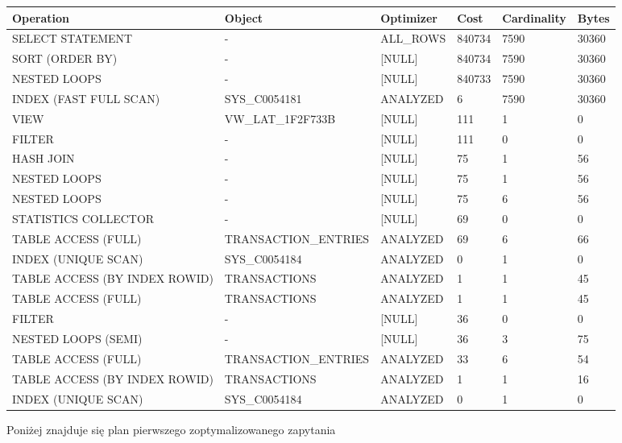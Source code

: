 \documentclass[11pt]{article}
\numberwithin{figure}{subsection}
\begin{document}
		\begin{tabularx}{\textwidth}{|X|X|X|X|X|X|}
Operation&Object&Optimizer&Cost&Cardinality&Bytes\\ \hline
SELECT STATEMENT& - &ALL\_ROWS&840734&7590&30360\\ \hline
SORT (ORDER BY)& - &[NULL]&840734&7590&30360\\ \hline
NESTED LOOPS& - &[NULL]&840733&7590&30360\\ \hline
INDEX (FAST FULL SCAN)&SYS\_C0054181&ANALYZED&6&7590&30360\\ \hline
VIEW&VW\_LAT\_1F2F733B&[NULL]&111&1&0\\ \hline
FILTER& - &[NULL]&111&0&0\\ \hline
HASH JOIN& - &[NULL]&75&1&56\\ \hline
NESTED LOOPS& - &[NULL]&75&1&56\\ \hline
NESTED LOOPS& - &[NULL]&75&6&56\\ \hline
STATISTICS COLLECTOR& - &[NULL]&69&0&0\\ \hline
TABLE ACCESS (FULL)&TRANSACTION\_ENTRIES&ANALYZED&69&6&66\\ \hline
INDEX (UNIQUE SCAN)&SYS\_C0054184&ANALYZED&0&1&0\\ \hline
TABLE ACCESS (BY INDEX ROWID)&TRANSACTIONS&ANALYZED&1&1&45\\ \hline
TABLE ACCESS (FULL)&TRANSACTIONS&ANALYZED&1&1&45\\ \hline
FILTER& - &[NULL]&36&0&0\\ \hline
NESTED LOOPS (SEMI)& - &[NULL]&36&3&75\\ \hline
TABLE ACCESS (FULL)&TRANSACTION\_ENTRIES&ANALYZED&33&6&54\\ \hline
TABLE ACCESS (BY INDEX ROWID)&TRANSACTIONS&ANALYZED&1&1&16\\ \hline
INDEX (UNIQUE SCAN)&SYS\_C0054184&ANALYZED&0&1&0\\ \hline
		\end{tabularx}
		
		Poniżej znajduje się plan pierwszego zoptymalizowanego zapytania \\
		
\end{document}
